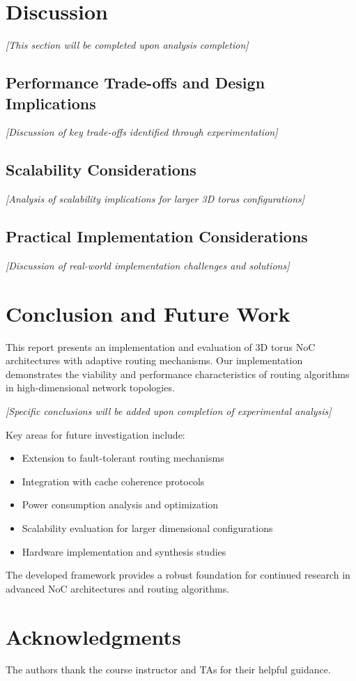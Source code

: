 \documentclass[a4paper,12pt]{article}
\begin{document}
\section{Discussion}

\textit{[This section will be completed upon analysis completion]}

\subsection{Performance Trade-offs and Design Implications}

\textit{[Discussion of key trade-offs identified through experimentation]}

\subsection{Scalability Considerations}

\textit{[Analysis of scalability implications for larger 3D torus configurations]}

\subsection{Practical Implementation Considerations}

\textit{[Discussion of real-world implementation challenges and solutions]}

\section{Conclusion and Future Work}

This report presents an implementation and evaluation of 3D torus NoC architectures with adaptive routing mechanisms. Our implementation demonstrates the viability and performance characteristics of routing algorithms in high-dimensional network topologies.

\textit{[Specific conclusions will be added upon completion of experimental analysis]}

Key areas for future investigation include:
\begin{itemize}
    \item Extension to fault-tolerant routing mechanisms
    \item Integration with cache coherence protocols
    \item Power consumption analysis and optimization
    \item Scalability evaluation for larger dimensional configurations
    \item Hardware implementation and synthesis studies
\end{itemize}

The developed framework provides a robust foundation for continued research in advanced NoC architectures and routing algorithms.

\section*{Acknowledgments}

The authors thank the course instructor and TAs for their helpful guidance.

\nocite{*}


\end{document}

